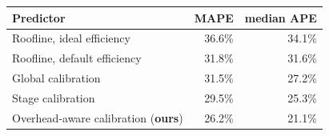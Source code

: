 \begin{tabular}{lrr}
\toprule
Predictor & MAPE & median APE \\
\midrule
Roofline, ideal efficiency & 36.6\% & 34.1\% \\
Roofline, default efficiency & 31.8\% & 31.6\% \\
Global calibration & 31.5\% & 27.2\% \\
Stage calibration & 29.5\% & 25.3\% \\
Overhead-aware calibration (\textbf{ours}) & 26.2\% & 21.1\% \\
\bottomrule
\end{tabular}
